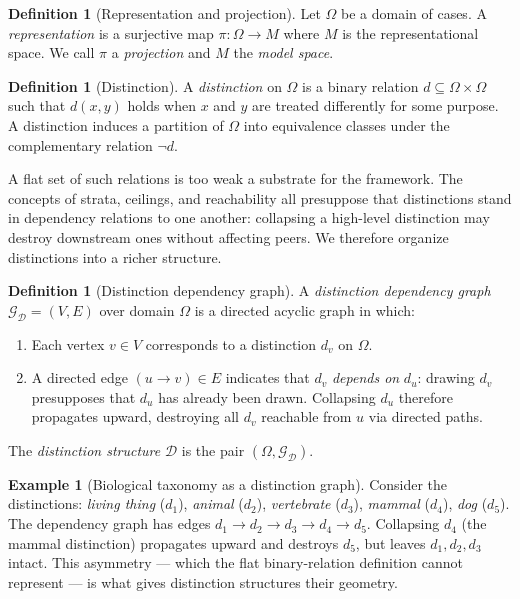 \documentclass[11pt, a4paper]{article}
\theoremstyle{plain}
\theoremstyle{definition}
\newtheorem{definition}[theorem]{Definition}
\newtheorem{example}[theorem]{Example}
\theoremstyle{remark}
\newcommand{\Dist}{\mathcal{D}}
\newcommand{\Proj}{\pi}
\newcommand{\DG}{\mathcal{G}_{\Dist}}
\begin{document}
\begin{definition}[Representation and projection]
\label{def:rep}
Let $\Omega$ be a domain of cases. A \emph{representation} is a
surjective map $\Proj : \Omega \to M$ where $M$ is the representational
space. We call $\Proj$ a \emph{projection} and $M$ the \emph{model space}.
\end{definition}

\begin{definition}[Distinction]
\label{def:dist}
A \emph{distinction} on $\Omega$ is a binary relation
$d \subseteq \Omega \times \Omega$ such that $d(x, y)$ holds when
$x$ and $y$ are treated differently for some purpose.
A distinction induces a partition of $\Omega$ into equivalence classes
under the complementary relation $\lnot d$.
\end{definition}

A flat set of such relations is too weak a substrate for the framework.
The concepts of strata, ceilings, and reachability all presuppose that
distinctions stand in dependency relations to one another: collapsing
a high-level distinction may destroy downstream ones without affecting
peers. We therefore organize distinctions into a richer structure.

\begin{definition}[Distinction dependency graph]
\label{def:ddg}
A \emph{distinction dependency graph} $\DG = (V, E)$ over domain $\Omega$
is a directed acyclic graph in which:
\begin{enumerate}[label=(\roman*)]
  \item Each vertex $v \in V$ corresponds to a distinction $d_v$ on $\Omega$.
  \item A directed edge $(u \to v) \in E$ indicates that $d_v$
        \emph{depends on} $d_u$: drawing $d_v$ presupposes that $d_u$
        has already been drawn. Collapsing $d_u$ therefore propagates
        upward, destroying all $d_v$ reachable from $u$ via directed paths.
\end{enumerate}
The \emph{distinction structure} $\Dist$ is the pair $(\Omega, \DG)$.
\end{definition}

\begin{example}[Biological taxonomy as a distinction graph]
Consider the distinctions: \textit{living thing} ($d_1$),
\textit{animal} ($d_2$), \textit{vertebrate} ($d_3$),
\textit{mammal} ($d_4$), \textit{dog} ($d_5$).
The dependency graph has edges $d_1 \to d_2 \to d_3 \to d_4 \to d_5$.
Collapsing $d_4$ (the mammal distinction) propagates upward and destroys
$d_5$, but leaves $d_1, d_2, d_3$ intact.
This asymmetry --- which the flat binary-relation definition cannot
represent --- is what gives distinction structures their geometry.
\end{example}
\end{document}
